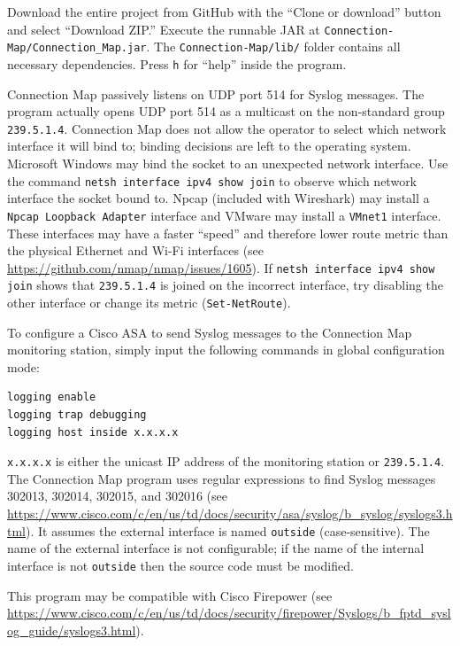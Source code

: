 \documentclass[12pt]{article}
\begin{document}
Download the entire project from GitHub with the ``Clone or download'' button and select ``Download ZIP.'' Execute the runnable JAR at \texttt{Connection-Map/Connection\_Map.jar}. The \texttt{Connection-Map/lib/} folder contains all necessary dependencies. Press \texttt{h} for ``help'' inside the program.

Connection Map passively listens on UDP port 514 for Syslog messages. The program actually opens UDP port 514 as a multicast on the non-standard group \texttt{239.5.1.4}. Connection Map does not allow the operator to select which network interface it will bind to; binding decisions are left to the operating system. Microsoft Windows may bind the socket to an unexpected network interface. Use the command \texttt{netsh interface ipv4 show join} to observe which network interface the socket bound to. Npcap (included with Wireshark) may install a \texttt{Npcap Loopback Adapter} interface and VMware may install a \texttt{VMnet1} interface. These interfaces may have a faster ``speed'' and therefore lower route metric than the physical Ethernet and Wi-Fi interfaces (see \url{https://github.com/nmap/nmap/issues/1605}). If \texttt{netsh interface ipv4 show join} shows that \texttt{239.5.1.4} is joined on the incorrect interface, try disabling the other interface or change its metric (\texttt{Set-NetRoute}).

To configure a Cisco ASA to send Syslog messages to the Connection Map monitoring station, simply input the following commands in global configuration mode:

\begin{lstlisting}
logging enable
logging trap debugging
logging host inside x.x.x.x
\end{lstlisting}

\texttt{x.x.x.x} is either the unicast IP address of the monitoring station or \texttt{239.5.1.4}. The Connection Map program uses regular expressions to find Syslog messages 302013, 302014, 302015, and 302016 (see \url{https://www.cisco.com/c/en/us/td/docs/security/asa/syslog/b_syslog/syslogs3.html}). It assumes the external interface is named \texttt{outside} (case-sensitive). The name of the external interface is not configurable; if the name of the internal interface is not \texttt{outside} then the source code must be modified.

This program may be compatible with Cisco Firepower (see \url{https://www.cisco.com/c/en/us/td/docs/security/firepower/Syslogs/b_fptd_syslog_guide/syslogs3.html}).
\end{document}
